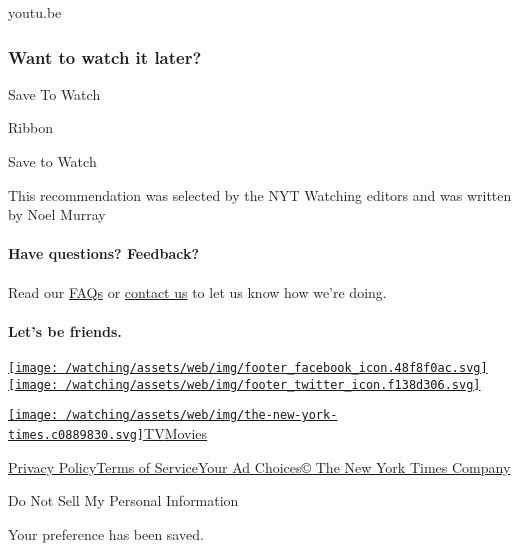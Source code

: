 youtu.be

\hypertarget{want-to-watch-it-later}{%
\subsubsection{Want to watch it later?}\label{want-to-watch-it-later}}

Save To Watch

Ribbon

Save to Watch

This recommendation was selected by the NYT Watching editors and was
written by Noel Murray

\hypertarget{have-questions-feedback}{%
\paragraph{Have questions? Feedback?}\label{have-questions-feedback}}

Read our \href{//www.nytimes.com/2017/01/10/watching/faq.html}{FAQs} or
\href{mailto:watchingcare@nytimes.com}{contact us} to let us know how
we're doing.

\hypertarget{lets-be-friends}{%
\paragraph{Let's be friends.}\label{lets-be-friends}}

\href{https://www.facebook.com/nytwatching/}{\texttt{[image: /watching/assets/web/img/footer\_facebook\_icon.48f8f0ac.svg]}}\href{https://twitter.com/watching}{\texttt{[image: /watching/assets/web/img/footer\_twitter\_icon.f138d306.svg]}}

\href{//www.nytimes.com}{\texttt{[image: /watching/assets/web/img/the-new-york-times.c0889830.svg]}}\href{//www.nytimes.com/section/arts/television}{TV}\href{//www.nytimes.com/section/movies}{Movies}

\href{//www.nytimes.com/content/help/rights/privacy/policy/privacy-policy.html}{Privacy
Policy}\href{//www.nytimes.com/content/help/rights/terms/terms-of-service.html}{Terms
of
Service}\href{//www.nytimes.com/content/help/rights/privacy/policy/privacy-policy.html\#pp}{Your
Ad Choices}\href{http://www.nytco.com/}{© The New York Times Company}

Do Not Sell My Personal Information

Your preference has been saved.
